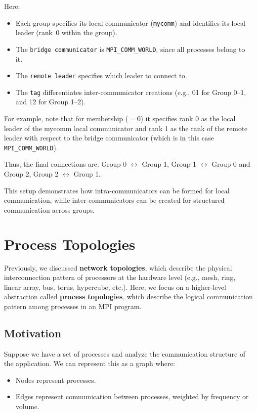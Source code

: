 \documentclass[12pt]{book}
\begin{document}
\begin{example}
Here:
\begin{itemize}
    \item Each group specifies its local communicator (\texttt{mycomm}) and identifies its local leader (rank~0 within the group).
    \item The \texttt{bridge communicator} is \texttt{MPI\_COMM\_WORLD}, since all processes belong to it.
    \item The \texttt{remote leader} specifies which leader to connect to.
    \item The \texttt{tag} differentiates inter-communicator creations (e.g., 01 for Group 0–1, and 12 for Group 1–2).
\end{itemize}  
For example, note that for membership ($=0$) it specifies rank 0 as the local leader of the mycomm local communicator and rank 1 as the rank of the remote leader with respect to the bridge communicator (which is in this case \texttt{MPI\_COMM\_WORLD}).

Thus, the final connections are:
Group 0 $\leftrightarrow$ Group 1, Group 1 $\leftrightarrow$ Group 0 and Group 2, Group 2 $\leftrightarrow$ Group 1.

This setup demonstrates how intra-communicators can be formed for local communication, while inter-communicators can be created for structured communication across groups.
\end{example}

\section{Process Topologies}

Previously, we discussed \textbf{network topologies}, which describe the physical interconnection pattern of processors at the hardware level (e.g., mesh, ring, linear array, bus, torus, hypercube, etc.).  
Here, we focus on a higher-level abstraction called \textbf{process topologies}, which describe the logical communication pattern among processes in an MPI program.

\subsection{Motivation}
Suppose we have a set of processes and analyze the communication structure of the application. We can represent this as a graph where:
\begin{itemize}
    \item Nodes represent processes.
    \item Edges represent communication between processes, weighted by frequency or volume.
\end{itemize}
\end{document}

